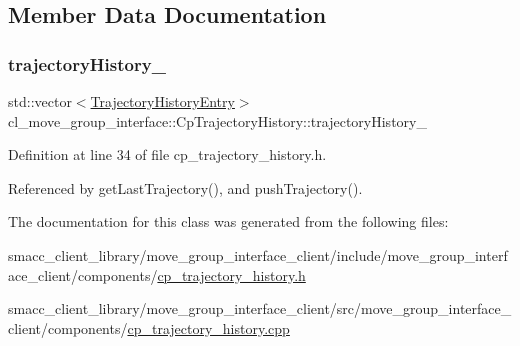 \subsection{Member Data Documentation}
\mbox{\label{classcl__move__group__interface_1_1CpTrajectoryHistory_ac5f17b74ca856f6f8ccb96d9a4786fb2}} 
\subsubsection{\texorpdfstring{trajectory\+History\+\_\+}{trajectoryHistory\_}}
{\footnotesize\ttfamily std\+::vector$<$\hyperlink{structcl__move__group__interface_1_1TrajectoryHistoryEntry}{Trajectory\+History\+Entry}$>$ cl\+\_\+move\+\_\+group\+\_\+interface\+::\+Cp\+Trajectory\+History\+::trajectory\+History\+\_\+\hspace{0.3cm}{\ttfamily [private]}}



Definition at line 34 of file cp\+\_\+trajectory\+\_\+history.\+h.



Referenced by get\+Last\+Trajectory(), and push\+Trajectory().



The documentation for this class was generated from the following files\+:\begin{DoxyCompactItemize}
\item 
smacc\+\_\+client\+\_\+library/move\+\_\+group\+\_\+interface\+\_\+client/include/move\+\_\+group\+\_\+interface\+\_\+client/components/\hyperlink{cp__trajectory__history_8h}{cp\+\_\+trajectory\+\_\+history.\+h}\item 
smacc\+\_\+client\+\_\+library/move\+\_\+group\+\_\+interface\+\_\+client/src/move\+\_\+group\+\_\+interface\+\_\+client/components/\hyperlink{cp__trajectory__history_8cpp}{cp\+\_\+trajectory\+\_\+history.\+cpp}\end{DoxyCompactItemize}
